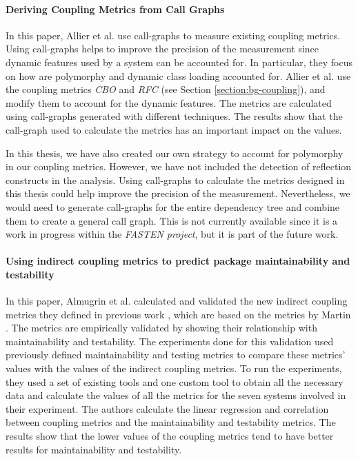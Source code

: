 \paragraph{Deriving Coupling Metrics from Call Graphs \cite{Allier2010}}

In this paper, Allier et al. use call-graphs to measure existing coupling metrics. Using call-graphs helps to improve the precision of the measurement since dynamic features used by a system can be accounted for. In particular, they focus on how are polymorphy and dynamic class loading accounted for. Allier et al. use the coupling metrics \textit{CBO} and \textit{RFC} (see Section \ref{section:bg-coupling}), and modify them to account for the dynamic features. The metrics are calculated using call-graphs generated with different techniques. The results show that the call-graph used to calculate the metrics has an important impact on the values.

In this thesis, we have also created our own strategy to account for polymorphy in our coupling metrics. However, we have not included the detection of reflection constructs in the analysis. Using call-graphs to calculate the metrics designed in this thesis could help improve the precision of the measurement. Nevertheless, we would need to generate call-graphs for the entire dependency tree and combine them to create a general call graph. This is not currently available since it is a work in progress within the \textit{FASTEN project}, but it is part of the future work.

\paragraph{Using indirect coupling metrics to predict package maintainability and testability \cite{Almugrin2016}}

In this paper, Almugrin et al. calculated and validated the new indirect coupling metrics they defined in previous work \cite{AlmugrinMelton2015}, which are based on the metrics by Martin \cite{martin2002agile}. The metrics are empirically validated by showing their relationship with maintainability and testability. The experiments done for this validation used previously defined maintainability and testing metrics to compare these metrics' values with the values of the indirect coupling metrics. To run the experiments, they used a set of existing tools and one custom tool to obtain all the necessary data and calculate the values of all the metrics for the seven systems involved in their experiment. The authors calculate the linear regression and correlation between coupling metrics and the maintainability and testability metrics. The results show that the lower values of the coupling metrics tend to have better results for maintainability and testability.

